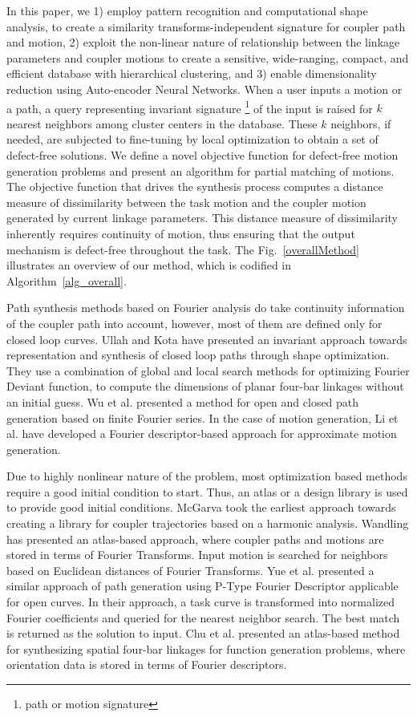 \documentclass[twocolumn,10pt]{asme2ej}
\begin{document}
In this paper, we 1) employ pattern recognition and computational shape analysis, to create a similarity transforms-independent signature for coupler path and motion, 2) exploit the non-linear nature of relationship between the linkage parameters and coupler motions to create a sensitive, wide-ranging, compact, and efficient database with hierarchical clustering, and 3) enable dimensionality reduction using Auto-encoder Neural Networks.
When a user inputs a motion or a path, a query representing invariant signature \footnote{path or motion signature} of the input is raised for $k$ nearest neighbors among cluster centers in the database.
These $k$ neighbors, if needed, are subjected to fine-tuning by local optimization to obtain a set of defect-free solutions.
We define a novel objective function for defect-free motion generation problems and present an algorithm for partial matching of motions.
The objective function that drives the synthesis process computes a distance measure of dissimilarity between the task motion and the coupler motion generated by current linkage parameters.
This distance measure of dissimilarity inherently requires continuity of motion, thus ensuring that the output mechanism is defect-free throughout the task.
The Fig.~\ref{overallMethod} illustrates an overview of our method, which is codified in Algorithm~\ref{alg_overall}.

Path synthesis methods based on Fourier analysis do take continuity information of the coupler path into account, however, most of them are defined only for closed loop curves.
Ullah and Kota\cite{ullah1997} have presented an invariant approach towards representation and synthesis of closed loop paths through shape optimization.
They use a combination of global and local search methods for optimizing Fourier Deviant function, to compute the dimensions of planar four-bar linkages without an initial guess.
Wu et al.\cite{wu2011} presented a method for open and closed path generation based on finite Fourier series.
In the case of motion generation, Li et al.\cite{li2016} have developed a Fourier descriptor-based approach for approximate motion generation.

Due to highly nonlinear nature of the problem, most optimization based methods require a good initial condition to start.
Thus, an atlas or a design library is used to provide good initial conditions.
McGarva\cite{mcgarva1994} took the earliest approach towards creating a library for coupler trajectories based on a harmonic analysis.
Wandling\cite{wandling2000} has presented an atlas-based approach, where coupler paths and motions are stored in terms of Fourier Transforms.
Input motion is searched for neighbors based on Euclidean distances of Fourier Transforms.
Yue et al.\cite{yue-pathgen2011} presented a similar approach of path generation using P-Type Fourier Descriptor applicable for open curves.
In their approach, a task curve is transformed into normalized Fourier coefficients and queried for the nearest neighbor search.
The best match is returned as the solution to input.
Chu et al.\cite{chu2010} presented an atlas-based method for synthesizing spatial four-bar linkages for function generation problems, where orientation data is stored in terms of Fourier descriptors.
\end{document}
